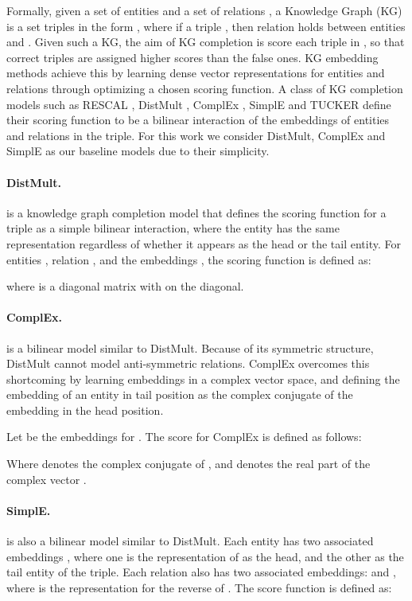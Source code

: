\documentclass[11pt,a4paper, dvipsnames]{article}
\begin{document}
Formally, given a set of entities
 and
a set of relations , a Knowledge Graph (KG) is a set triples in the form , where if a triple , then relation  holds between entities  and . Given such a KG, the aim of KG completion is score each triple in , so that correct triples are assigned higher scores than the false ones. KG embedding methods achieve this by learning dense vector representations for entities and relations through optimizing a chosen scoring function. 
A class of KG completion models such as RESCAL \citep{Nickel2012FactorizingData}, DistMult \citep{Yang2014EmbeddingBases}, ComplEx \citep{Trouillon2016ComplexPrediction}, SimplE \citep{Kazemi2018SimplEGraphs} and TUCKER \citep{balavzevic2019tucker} define their scoring function to be a bilinear interaction of the embeddings of entities and relations in the triple. For this work we consider DistMult, ComplEx and SimplE as our baseline models due to their simplicity.

\paragraph{DistMult.} \citep{Yang2014EmbeddingBases} is a knowledge graph completion model that defines the scoring function for a triple as a simple bilinear interaction, where the entity has the same representation regardless of whether it appears as the head or the tail entity. For entities , relation , and the embeddings , the scoring function is defined as:


 where   is a diagonal matrix with  on the diagonal.
 
 \paragraph{ComplEx.} \citep{Trouillon2016ComplexPrediction} is a bilinear model similar to DistMult. Because of its symmetric structure, DistMult cannot model anti-symmetric relations. ComplEx overcomes this shortcoming by learning embeddings in a complex vector space, and defining the embedding of an entity in tail position as the complex conjugate of the embedding in the head position.
 
 Let  be the embeddings for . The score for ComplEx is defined as follows:


Where  denotes the complex conjugate of , and  denotes the real part of the complex vector .

\paragraph{SimplE.} \citep{Kazemi2018SimplEGraphs} is also a bilinear model similar to DistMult. Each entity has two associated embeddings , where one is the representation of  as the head, and the other as the tail entity of the triple. Each relation also has two associated embeddings:  and , where  is the representation for the reverse of . The score function is defined as: 
\end{document}
